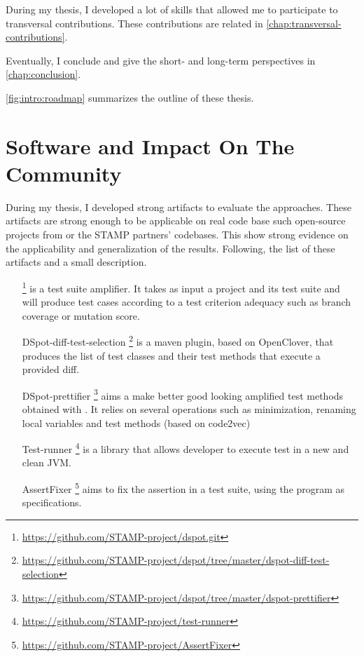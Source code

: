 During my thesis, I developed a lot of skills that allowed me to participate to transversal contributions. 
These contributions are related in \autoref{chap:transversal-contributions}.

Eventually, I conclude and give the short- and long-term perspectives in \autoref{chap:conclusion}.

\autoref{fig:intro:roadmap} summarizes the outline of these thesis.

\section{Software and Impact On The Community}
\label{sec:intro:software}

During my thesis, I developed strong artifacts to evaluate the approaches.
These artifacts are strong enough to be applicable on real code base such open-source projects from \gh or the STAMP partners' codebases.
This show strong evidence on the applicability and generalization of the results.
Following, the list of these artifacts and a small description.

\begin{itemize}
	\item[\dspot]\footnote{\url{https://github.com/STAMP-project/dspot.git}} is a test suite amplifier. 
	It takes as input a project and its test suite and will produce test cases according to a test criterion adequacy such as branch coverage or mutation score. 
	\item[DSpot-diff-test-selection]\footnote{\url{https://github.com/STAMP-project/dspot/tree/master/dspot-diff-test-selection}} is a maven plugin, based on OpenClover, that produces the list of test classes and their test methods that execute a provided diff.
	\item[DSpot-prettifier]\footnote{\url{https://github.com/STAMP-project/dspot/tree/master/dspot-prettifier}} aims a make better good looking amplified test methods obtained with \dspot. 
	It relies on several operations such as minimization, renaming local variables and test methods (based on code2vec)
	\item [Test-runner]\footnote{\url{https://github.com/STAMP-project/test-runner}} is a library that allows developer to execute test in a new and clean JVM. 
	\item[AssertFixer]\footnote{\url{https://github.com/STAMP-project/AssertFixer}} aims to fix the assertion in a test suite, using the program as specifications.
\end{itemize}

